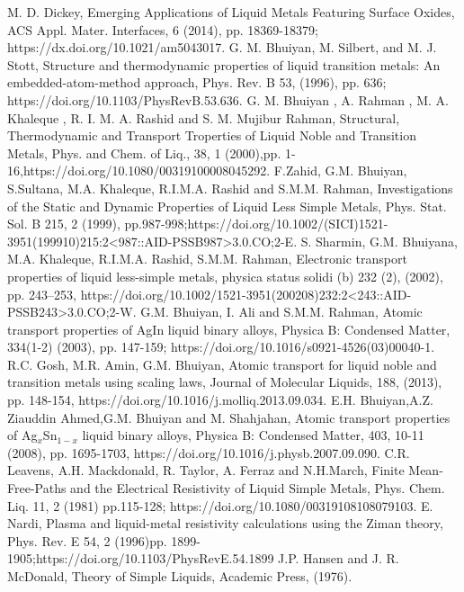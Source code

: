 \documentclass[final12pt]{elsarticle}
\begin{document}
\begin{thebibliography}{thesis}

M. D. Dickey, Emerging Applications of Liquid Metals Featuring Surface Oxides, ACS Appl. Mater. Interfaces, 6 (2014), pp. 18369-18379; https://dx.doi.org/10.1021/am5043017. 
G. M. Bhuiyan, M. Silbert, and M. J. Stott, Structure and thermodynamic properties of liquid transition metals: An embedded-atom-method approach, Phys. Rev. B 53, (1996), pp. 636; https://doi.org/10.1103/PhysRevB.53.636.
G. M. Bhuiyan , A. Rahman , M. A. Khaleque , R. I. M. A. Rashid and S. M. Mujibur Rahman, Structural, Thermodynamic and Transport Troperties of Liquid Noble and Transition Metals, Phys. and Chem. of Liq., 38, 1 (2000),pp. 1-16,https://doi.org/10.1080/00319100008045292.
F.Zahid, G.M. Bhuiyan, S.Sultana, M.A. Khaleque, R.I.M.A. Rashid and S.M.M. Rahman, Investigations of the Static and Dynamic Properties of Liquid Less Simple Metals, Phys. Stat. Sol. B 215, 2 (1999), pp.987-998;https://doi.org/10.1002/(SICI)1521-3951(199910)215:2<987::AID-PSSB987>3.0.CO;2-E.
S. Sharmin, G.M. Bhuiyana, M.A. Khaleque, R.I.M.A. Rashid, S.M.M. Rahman, Electronic transport properties of liquid less-simple metals, physica status solidi (b) 232 (2), (2002), pp. 243–253, https://doi.org/10.1002/1521-3951(200208)232:2<243::AID-PSSB243>3.0.CO;2-W.
G.M. Bhuiyan, I. Ali and S.M.M. Rahman, Atomic transport properties of AgIn liquid binary alloys, Physica B: Condensed Matter, 334(1-2) (2003), pp. 147-159; https://doi.org/10.1016/s0921-4526(03)00040-1.
R.C. Gosh, M.R. Amin, G.M. Bhuiyan, Atomic transport for liquid noble and transition metals using scaling laws, Journal of Molecular Liquids, 188, (2013), pp. 148-154, https://doi.org/10.1016/j.molliq.2013.09.034.
E.H. Bhuiyan,A.Z. Ziauddin Ahmed,G.M. Bhuiyan and M. Shahjahan, Atomic transport properties of Ag$_x$Sn$_{1-x}$ liquid binary alloys, Physica B: Condensed Matter, 403, 10-11 (2008), pp. 1695-1703, https://doi.org/10.1016/j.physb.2007.09.090.
C.R. Leavens, A.H. Mackdonald, R. Taylor, A. Ferraz and N.H.March, Finite Mean-Free-Paths and the Electrical Resistivity of Liquid Simple Metals, Phys. Chem. Liq. 11, 2 (1981) pp.115-128; https://doi.org/10.1080/00319108108079103.
E. Nardi, Plasma and liquid-metal resistivity calculations using the Ziman theory, Phys. Rev. E 54, 2 (1996)pp. 1899-1905;https://doi.org/10.1103/PhysRevE.54.1899
J.P. Hansen and J. R. McDonald, Theory of Simple Liquids, Academic Press, (1976).

\end{thebibliography}
\end{document}
